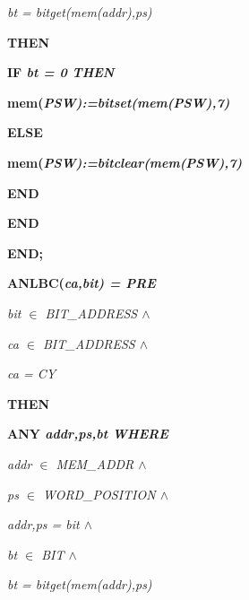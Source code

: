\begin{sloppypar}
\hspace*{0.30in}\it bt \rm = \it bitget\rm (\it mem\rm (\it addr\rm )\rm ,\it ps\rm )

\hspace*{0.20in}\bf THEN

\hspace*{0.30in}\bf IF \it bt \rm = \rm 0 \bf THEN

\hspace*{0.40in}\bf mem\rm (\it PSW\rm )\rm :=\it bitset\rm (\it mem\rm (\it PSW\rm )\rm ,\rm 7\rm )

\hspace*{0.30in}\bf ELSE

\hspace*{0.40in}\bf mem\rm (\it PSW\rm )\rm :=\it bitclear\rm (\it mem\rm (\it PSW\rm )\rm ,\rm 7\rm )

\hspace*{0.30in}\bf END

\hspace*{0.20in}\bf END

\hspace*{0.10in}\bf END\rm ;

\hspace*{0.10in}\bf ANLBC\rm (\it ca\rm ,\it bit\rm ) \rm = \bf PRE

\hspace*{0.20in}\it bit $\in$  \it BIT\_ADDRESS  $\land$ 

\hspace*{0.20in}\it ca $\in$  \it BIT\_ADDRESS  $\land$ 

\hspace*{0.20in}\it ca \rm = \it CY

\hspace*{0.10in}\bf THEN

\hspace*{0.20in}\bf ANY \it addr\rm ,\it ps\rm ,\it bt \bf WHERE

\hspace*{0.30in}\it addr $\in$  \it MEM\_ADDR  $\land$ 

\hspace*{0.30in}\it ps $\in$  \it WORD\_POSITION  $\land$ 

\hspace*{0.30in}\it addr\rm ,\it ps \rm = \it bit  $\land$ 

\hspace*{0.30in}\it bt $\in$  \it BIT  $\land$ 

\hspace*{0.30in}\it bt \rm = \it bitget\rm (\it mem\rm (\it addr\rm )\rm ,\it ps\rm )


\end{sloppypar}
